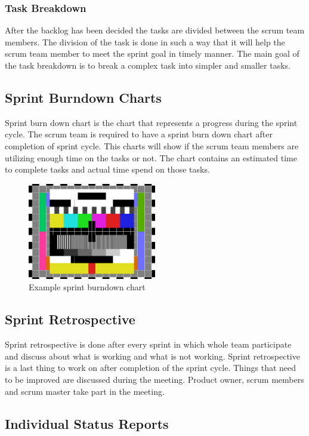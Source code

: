 \subsubsection{Task Breakdown}
After the backlog has been decided the tasks are divided between the scrum team members. The division of the task is done in such a way that it will help the scrum team member to meet the sprint goal in timely manner. The main goal of the task breakdown is to break a complex task into simpler and smaller tasks.

\subsection{Sprint Burndown Charts}
Sprint burn down chart is the chart that represents a progress during the sprint cycle. The scrum team is required to have a sprint burn down chart after completion of sprint cycle. This charts will show if the scrum team members are utilizing enough time on the tasks or not. The chart contains an estimated time to complete tasks and actual time spend on those tasks.

\begin{figure}[h!]
    \centering
    \includegraphics[width=0.5\textwidth]{images/test_image}
    \caption{Example sprint burndown chart}
\end{figure}

\subsection{Sprint Retrospective}
Sprint retrospective is done after every sprint in which whole team participate and discuss about what is working and what is not working. Sprint retrospective is a last thing to work on after completion of the sprint cycle. Things that need to be improved are discussed during the meeting. Product owner, scrum members and scrum master take part in the meeting. 

\subsection{Individual Status Reports}

